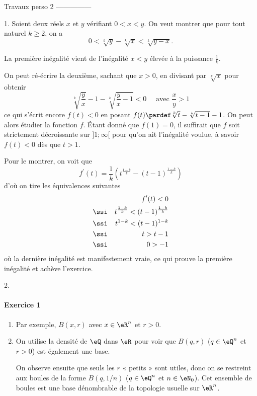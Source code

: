 Travaux perso 2 ---------------

1. Soient deux réels $x$ et $y$ vérifiant $0 < x < y$. On veut montrer
que pour tout naturel $k \geq 2$, on a
\[0 < \sqrt[k]{y} - \sqrt[k]{x} < \sqrt[k]{y-x}.\]

La première inégalité vient de l'inégalité $x < y$ élevée à la
puissance $\frac1k$.

On peut ré-écrire la deuxième, sachant que $x > 0$, en divisant par
$\sqrt[k]{x}$ pour obtenir
\begin{equation}
	\sqrt[k]{\frac yx} - 1 - \sqrt[k]{\frac yx-1} < 0 \quad \text{ avec }\frac xy > 1
\end{equation}
ce qui s'écrit encore $f(t) < 0$ en posant
$f(t) \pardef \sqrt[k]t - \sqrt[k]{t-1} - 1$. On peut alors étudier
la fonction $f$. Étant donné que $f(1) = 0$, il suffirait que $f$
soit strictement décroissante sur $]1;\infty[$ pour qu'on ait
l'inégalité voulue, à savoir $f(t) < 0$ dès que $t > 1$.

Pour le montrer, on voit que
\[f^\prime(t) = \frac 1k \left(t^{\frac{1-k}k} -
	({t-1})^{\frac{1-k}k}\right)\] d'où on tire les équivalences
suivantes
\begin{align}
	 &      & f^\prime(t) < 0                         \\
	 & \ssi & t^{\frac{1-k}k} < ({t-1})^{\frac{1-k}k} \\
	 & \ssi & t^{1-k} < ({t-1})^{1-k}                 \\
	 & \ssi & t > t-1                                 \\
	 & \ssi & 0 > -1
\end{align}
où la dernière inégalité est manifestement vraie, ce qui prouve la
première inégalité et achève l'exercice.

2.


\paragraph{Exercice 1}
\begin{enumerate}
	\item Par exemple, $B(x,r)$ avec $x \in \eR^n$ et $r > 0$.

	\item On utilise la densité de $\eQ$ dans $\eR$ pour voir que $B(q,r)$
	      ($q \in \eQ^n$ et $r > 0$) est également une base.

	      On observe ensuite que seuls les $r$ « petits » sont utiles,
	      donc on se restreint aux boules de la forme $B(q,1/n)$ ($q \in
		      \eQ^n$ et $n \in \eN_0$). Cet ensemble de boules est une base
	      dénombrable de la topologie usuelle sur
	      $\eR^n$.
\end{enumerate}
